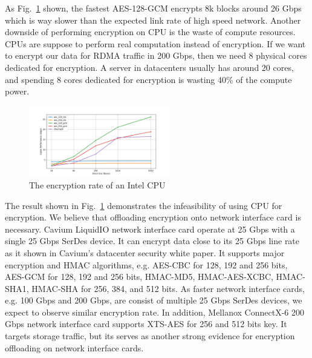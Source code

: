 As Fig.~\ref{fig:cpu_encryption_rate} shown, the fastest AES-128-GCM encrypts 8k blocks around 26 Gbps which is way slower than the expected link rate of high speed network. Another downside of performing encryption on CPU is the waste of compute resources. CPUs are suppose to perform real computation instead of encryption. If we want to encrypt our data for RDMA traffic in 200 Gbps, then we need 8 physical cores dedicated for encryption. A server in datacenters usually has around 20 cores, and spending 8 cores dedicated for encryption is wasting 40\% of the compute power.

\begin{figure}[ht]
    \centering
    \includegraphics[width=0.55\textwidth]{fig/encryption}
    \caption{The encryption rate of an Intel CPU}
    \label{fig:cpu_encryption_rate}
\end{figure}

The result shown in Fig.~\ref{fig:cpu_encryption_rate} demonstrates the infeasibility of using CPU for encryption. We believe that offloading encryption onto network interface card is necessary. Cavium LiquidIO network interface card operate at 25 Gbps with a single 25 Gbps SerDes device. It can encrypt data close to its 25 Gbps line rate as it shown in Cavium's datacenter security white paper. It supports major encryption and HMAC algorithms, e.g. AES-CBC for 128, 192 and 256 bits, AES-GCM for 128, 192 and 256 bits, HMAC-MD5, HMAC-AES-XCBC, HMAC-SHA1, HMAC-SHA for 256, 384, and 512 bits. As faster network interface cards, e.g. 100 Gbps and 200 Gbps, are consist of multiple 25 Gbps SerDes devices, we expect to observe similar encryption rate. In addition, Mellanox ConnectX-6 200 Gbps network interface card supports XTS-AES for 256 and 512 bits key. It targets storage traffic, but its serves as another strong evidence for encryption offloading on network interface cards.
